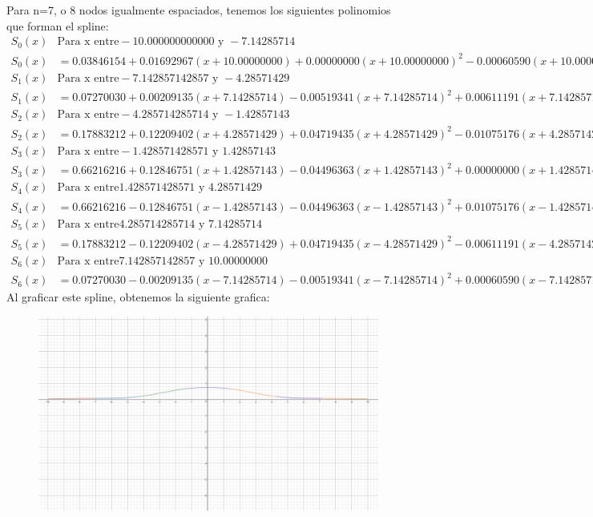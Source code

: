 Para n=7, o 8 nodos igualmente espaciados, tenemos los siguientes polinomios que forman el spline:
\begin{align*}
S_0(x) & \text{Para x entre} -10.000000000000 \text{ y } -7.14285714 \\
S_0(x) & = 0.03846154+0.01692967(x+10.00000000)+0.00000000(x+10.00000000)^2-0.00060590(x+10.00000000)^3 \\
S_1(x) & \text{Para x entre} -7.142857142857 \text{ y } -4.28571429 \\
S_1(x) & = 0.07270030+0.00209135(x+7.14285714)-0.00519341(x+7.14285714)^2+0.00611191(x+7.14285714)^3 \\
S_2(x) & \text{Para x entre} -4.285714285714 \text{ y } -1.42857143 \\
S_2(x) & = 0.17883212+0.12209402(x+4.28571429)+0.04719435(x+4.28571429)^2-0.01075176(x+4.28571429)^3 \\
S_3(x) & \text{Para x entre} -1.428571428571 \text{ y } 1.42857143 \\
S_3(x) & = 0.66216216+0.12846751(x+1.42857143)-0.04496363(x+1.42857143)^2+0.00000000(x+1.42857143)^3 \\
S_4(x) & \text{Para x entre} 1.428571428571 \text{ y } 4.28571429 \\
S_4(x) & = 0.66216216-0.12846751(x-1.42857143)-0.04496363(x-1.42857143)^2+0.01075176(x-1.42857143)^3 \\
S_5(x) & \text{Para x entre} 4.285714285714 \text{ y } 7.14285714 \\
S_5(x) & = 0.17883212-0.12209402(x-4.28571429)+0.04719435(x-4.28571429)^2-0.00611191(x-4.28571429)^3 \\
S_6(x) & \text{Para x entre} 7.142857142857 \text{ y } 10.00000000 \\
S_6(x) & = 0.07270030-0.00209135(x-7.14285714)-0.00519341(x-7.14285714)^2+0.00060590(x-7.14285714)^3
\end{align*}
Al graficar este spline, obtenemos la siguiente grafica:
\begin{figure}[H]
	\centering
	\includegraphics[scale=0.2]{img/2_7.png}
\end{figure}
